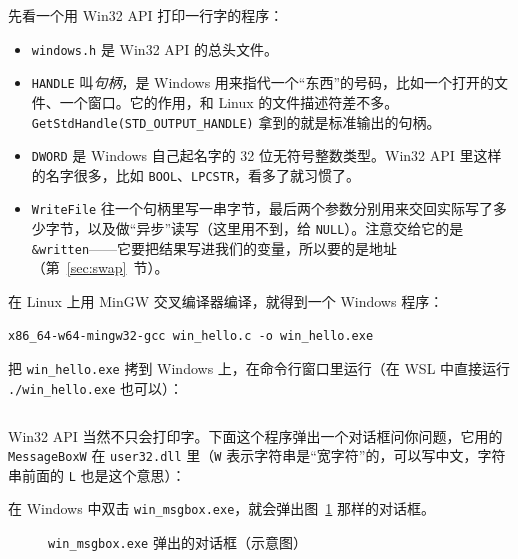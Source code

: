 先看一个用 Win32 API 打印一行字的程序：


\begin{itemize}
  \item \texttt{windows.h} 是 Win32 API 的总头文件。
  \item \texttt{HANDLE} 叫\emph{句柄}，是 Windows 用来指代一个“东西”的号码，比如一个打开的文件、一个窗口。它的作用，和 Linux 的文件描述符差不多。\texttt{GetStdHandle(STD\_OUTPUT\_HANDLE)} 拿到的就是标准输出的句柄。
  \item \texttt{DWORD} 是 Windows 自己起名字的 32 位无符号整数类型。Win32 API 里这样的名字很多，比如 \texttt{BOOL}、\texttt{LPCSTR}，看多了就习惯了。
  \item \texttt{WriteFile} 往一个句柄里写一串字节，最后两个参数分别用来交回实际写了多少字节，以及做“异步”读写（这里用不到，给 \texttt{NULL}）。注意交给它的是 \texttt{\&written}——它要把结果写进我们的变量，所以要的是地址（第~\ref{sec:swap}~节）。
\end{itemize}

在 Linux 上用 MinGW 交叉编译器编译，就得到一个 Windows 程序：
\begin{verbatim}
x86_64-w64-mingw32-gcc win_hello.c -o win_hello.exe
\end{verbatim}
把 \texttt{win\_hello.exe} 拷到 Windows 上，在命令行窗口里运行（在 WSL 中直接运行 \texttt{./win\_hello.exe} 也可以）：
\inputminted[linenos=false]{text}{code/ch05/out/win_hello.txt}

Win32 API 当然不只会打印字。下面这个程序弹出一个对话框问你问题，它用的 \texttt{MessageBoxW} 在 \texttt{user32.dll} 里（\texttt{W} 表示字符串是“宽字符”的，可以写中文，字符串前面的 \texttt{L} 也是这个意思）：


在 Windows 中双击 \texttt{win\_msgbox.exe}，就会弹出图~\ref{fig:msgbox} 那样的对话框。

\begin{figure}[htbp]
  \centering
  \caption{\texttt{win\_msgbox.exe} 弹出的对话框（示意图）}
  \label{fig:msgbox}
\end{figure}


